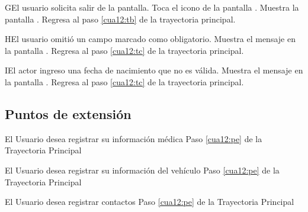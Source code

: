 \begin{UCtrayectoriaA}{G}{El usuario solicita salir de la pantalla.}
    \UCpaso[\UCactor] Toca el icono \btnRegresar de la pantalla .
	\UCpaso[\UCsist] Muestra la pantalla . 
	\UCpaso[] Regresa al paso \ref{cua12:tb} de la trayectoria principal.
 \end{UCtrayectoriaA}

 \begin{UCtrayectoriaA}{H}{El usuario omitió un campo marcado como obligatorio.}
 	\UCpaso[\UCsist] Muestra el mensaje  en la pantalla .
	\UCpaso[] Regresa al paso \ref{cua12:tc} de la trayectoria principal. 
\end{UCtrayectoriaA}

 \begin{UCtrayectoriaA}{I}{El actor ingreso una fecha de nacimiento que no es válida.}
 	\UCpaso[\UCsist] Muestra el mensaje  en la pantalla .
	\UCpaso[] Regresa al paso \ref{cua12:tc} de la trayectoria principal. 
\end{UCtrayectoriaA}


\subsection{Puntos de extensión}

\UCExtensionPoint
{El Usuario desea registrar su información médica}
{ Paso \ref{cua12:pe} de la Trayectoria Principal}
{}

\UCExtensionPoint
{El Usuario desea registrar su información del vehículo}
{ Paso \ref{cua12:pe} de la Trayectoria Principal}
{}

\UCExtensionPoint
{El Usuario desea registrar contactos}
{ Paso \ref{cua12:pe} de la Trayectoria Principal}
{}

